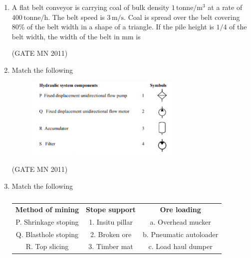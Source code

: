 \documentclass[journal]{IEEEtran}
\begin{document}
\begin{enumerate}
\item A flat belt conveyor is carrying coal of bulk density $1\, \mathrm{tonne/m^3}$ at a rate of $400 \, \mathrm{tonne/h}$. The belt speed is $3\, \mathrm{m/s}$. Coal is spread over the belt covering 80\% of the belt width in a shape of a triangle. If the pile height is $1/4$ of the belt width, the width of the belt in mm is

	\hfill(GATE MN 2011)
\begin{enumerate}
\end{enumerate}

\item Match the following

 \begin{figure}[H]
    \centering
        \includegraphics[width=0.7\textwidth]{Screenshot_2025_0816_113416.png}
	    \caption{}
    \label{fig:Q33}
    \end{figure}


    \hfill(GATE MN 2011)
\begin{enumerate}
\end{enumerate}

\item Match the following
	\begin{table}[H]
    \centering\normalsize
\begin{tabular}{c c c}                
\textbf{Method of mining} & \textbf{Stope support} & \textbf{Ore loading}  \\   
P. Shrinkage stoping & 1. Insitu pillar & a. Overhead mucker  \\        
Q. Blasthole stoping & 2. Broken ore & b. Pneumatic autoloader \\              
R. Top slicing & 3. Timber mat & c. Load haul dumper  \\                
\end{tabular}
\caption{}
    \label{tab:Q32}
\end{table}


\end{enumerate}
\end{document}
